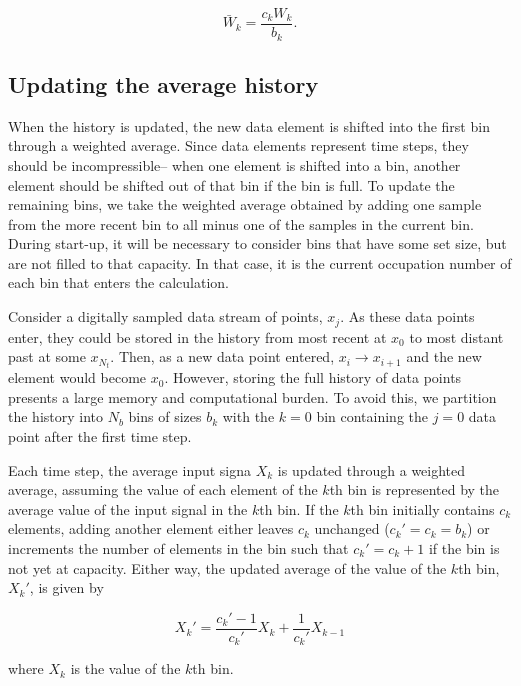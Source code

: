 \begin{equation}
\bar{W}_k= \frac{c_k W_k}{b_k}.
\label{Wbar}
\end{equation} 

\subsection{Updating the average history}

When the history is updated, the new data element is shifted into the first bin through a weighted average. Since data elements represent time steps, they should be incompressible-- when one element is shifted into a bin, another element should be shifted out of that bin if the bin is full. To update the remaining bins, we take the weighted average obtained by adding one sample from the more recent bin to all minus one of the samples in the current bin. During start-up, it will be necessary to consider bins that have some set size, but are not filled to that capacity. In that case, it is the current occupation number of each bin that enters the calculation. 

Consider a digitally sampled data stream of points, $x_j$. As these data points enter, they could be stored in the history from most recent at $x_0$ to most distant past at some $x_{N_t}$.  Then, as a new data point entered, $x_i\rightarrow x_{i+1}$ and the new element would become $x_0$. However, storing the full history of data points presents a large memory and computational burden. To avoid this, we partition the history into $N_b$ bins of sizes $b_k$ with the $k=0$ bin containing the $j=0$ data point after the first time step. 

Each time step, the average input signa $X_k$ is updated through a weighted average, assuming the value of each element of the $k$th bin is represented by the average value of the input signal in the $k$th bin. If the $k$th bin initially contains $c_k$
elements, adding another element either leaves $c_k$ unchanged
($c_k\prime=c_k=b_k$) or increments the number of elements in the bin such
that $c_k\prime = c_k + 1$ if the bin is not yet at capacity. Either way, the updated average of the
value of the $k$th bin, $X_k\prime$, is given by

\begin{equation}
X_k\prime = \frac{c_k\prime-1}{c_k\prime}X_k + \frac{1}{c_k\prime}X_{k-1}
\label{avgShiftReg}
\end{equation}

\noindent where $X_k$ is the value of the $k$th bin.








